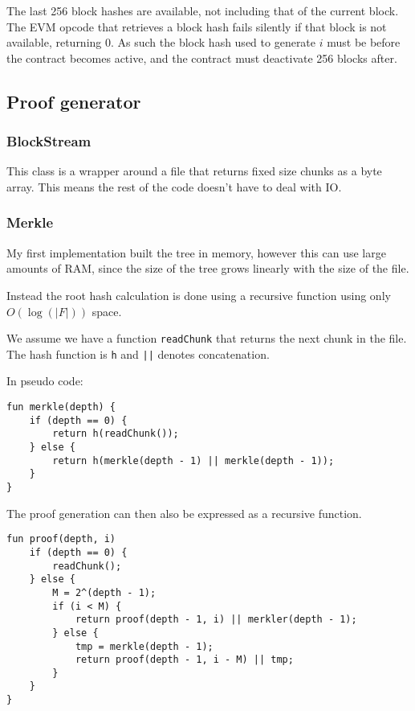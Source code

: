 \documentclass[10pt,twoside,a4paper]{article}
\begin{document}
The last 256 block hashes are available, not including that of the current block.
The EVM opcode that retrieves a block hash fails silently if that block is not available, returning 0.
As such the block hash used to generate $i$ must be before the contract becomes active,
and the contract must deactivate 256 blocks after.





\subsection{Proof generator}

\subsubsection{BlockStream}

This class is a wrapper around a file that returns fixed size chunks as a byte array.
This means the rest of the code doesn't have to deal with IO.

\subsubsection{Merkle}

My first implementation built the tree in memory, however this can use large amounts of RAM, since the size of the tree grows linearly with the size of the file.

Instead the root hash calculation is done using a recursive function using only $O(\log(|F|))$ space.

We assume we have a function \texttt{readChunk} that returns the next chunk in the file.
The hash function is \texttt{h} and \texttt{||} denotes concatenation.

In pseudo code:

\lstset{
breaklines=true,
basicstyle=\ttfamily\small,
tabsize=4
}
\begin{lstlisting}
fun merkle(depth) {
    if (depth == 0) {
        return h(readChunk());
    } else {
        return h(merkle(depth - 1) || merkle(depth - 1));
    }
}
\end{lstlisting}

The proof generation can then also be expressed as a recursive function.

\begin{lstlisting}
fun proof(depth, i)
    if (depth == 0) {
        readChunk();
    } else {
        M = 2^(depth - 1);
        if (i < M) {
            return proof(depth - 1, i) || merkler(depth - 1);
        } else {
            tmp = merkle(depth - 1);
            return proof(depth - 1, i - M) || tmp;
        }
    }
}
\end{lstlisting}
\end{document}
